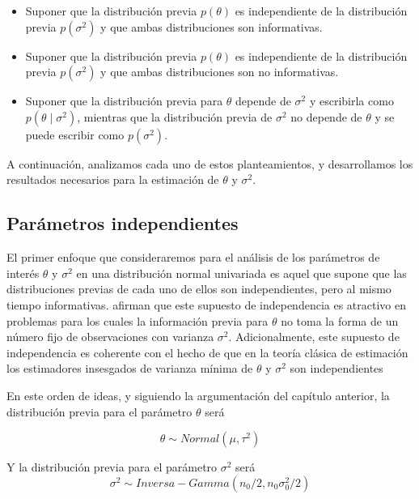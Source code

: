\documentclass[
  10pt,
  spanish,
]{book}
\providecommand{\tightlist}{%
  \setlength{\itemsep}{0pt}\setlength{\parskip}{0pt}}
\theoremstyle{definition}
\theoremstyle{definition}
\theoremstyle{definition}
\theoremstyle{definition}
\theoremstyle{remark}
\begin{document}
\begin{itemize}
\tightlist
\item
  Suponer que la distribución previa \(p(\theta)\) es independiente de la distribución previa \(p(\sigma^2)\) y que ambas distribuciones son informativas.
\item
  Suponer que la distribución previa \(p(\theta)\) es independiente de la distribución previa \(p(\sigma^2)\) y que ambas distribuciones son no informativas.
\item
  Suponer que la distribución previa para \(\theta\) depende de \(\sigma^2\) y escribirla como \(p(\theta \mid \sigma^2)\), mientras que la distribución previa de \(\sigma^2\) no depende de \(\theta\) y se puede escribir como \(p(\sigma^2)\).
\end{itemize}

A continuación, analizamos cada uno de estos planteamientos, y desarrollamos los resultados necesarios para la estimación de \(\theta\) y \(\sigma^2\).

\hypertarget{paruxe1metros-independientes}{%
\subsection{Parámetros independientes}\label{paruxe1metros-independientes}}

El primer enfoque que consideraremos para el análisis de los parámetros de interés \(\theta\) y \(\sigma^2\) en una distribución normal univariada es aquel que supone que las distribuciones previas de cada uno de ellos son independientes, pero al mismo tiempo informativas. \citet{Gelman03} afirman que este supuesto de independencia es atractivo en problemas para los cuales la información previa para \(\theta\) no toma la forma de un número fijo de observaciones con varianza \(\sigma^2\). Adicionalmente, este supuesto de independencia es coherente con el hecho de que en la teoría clásica de estimación los estimadores insesgados de varianza mínima de \(\theta\) y \(\sigma^2\) son independientes \citep[Sección 2.4]{Zhang}

En este orden de ideas, y siguiendo la argumentación del capítulo anterior, la distribución previa para el parámetro \(\theta\) será

\begin{equation*}
\theta \sim Normal(\mu,\tau^2)
\end{equation*}

Y la distribución previa para el parámetro \(\sigma^2\) será
\begin{equation*}
\sigma^2 \sim Inversa-Gamma(n_0/2,n_0\sigma^2_0/2)
\end{equation*}
\end{document}
